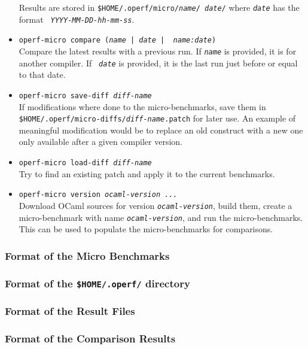 \documentclass[11pt,a4paper]{article}
\begin{document}
\begin{itemize}
  Results are stored in {\tt \$HOME/.operf/micro/{\em name}/{\em
      date}/} where {\tt\em date} has the format {\tt\em
    YYYY-MM-DD-hh-mm-ss}.
\item {\tt operf-micro compare {\tt ({\em name} | {\em date} | {\em
      name:date}) }}\\ Compare the latest results with a previous run.
  If {\tt\em name} is provided, it is for another compiler. If {\tt\em
    date} is provided, it is the last run just before or equal to that
  date.
\item {\tt operf-micro save-diff {\em diff-name}}\\
  If modifications where done to the micro-benchmarks, save them in
  {\tt \$HOME/.operf/micro-diffs/{\em diff-name}.patch} for later use.
  An example of meaningful modification would be to replace an old
  construct with a new one only available after a given compiler version.
\item  {\tt operf-micro load-diff {\em diff-name}}\\
  Try to find an existing patch and apply it to the current benchmarks.
\item {\tt operf-micro version {\em ocaml-version ...}}\\ Download OCaml
  sources for version {\tt\em ocaml-version}, build them, create a
  micro-benchmark with name {\tt\em ocaml-version}, and run the
  micro-benchmarks. This can be used to populate the micro-benchmarks
  for comparisons.
\end{itemize}

\subsubsection{Format of the Micro Benchmarks}

\subsubsection{Format of the {\tt \$HOME/.operf/} directory}

\subsubsection{Format of the Result Files}

\subsubsection{Format of the Comparison Results}
\end{document}
